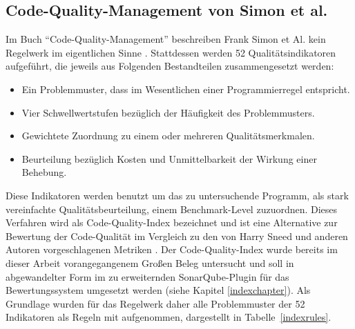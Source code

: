 \documentclass[da,ngerman]{stthesis}
\begin{document}
			\subsection{Code-Quality-Management von Simon et al.} \label{cqirules}
				Im Buch "`Code-Quality-Management"' beschreiben Frank Simon et Al. kein Regelwerk im eigentlichen Sinne \cite{CodeQualityManagement}. Stattdessen werden 52 Qualitätsindikatoren aufgeführt, die jeweils aus Folgenden Bestandteilen zusammengesetzt werden:
				\begin{itemize}
					\item Ein Problemmuster, dass im Wesentlichen einer Programmierregel entspricht.
					\item Vier Schwellwertstufen bezüglich der Häufigkeit des Problemmusters. 
					\item Gewichtete Zuordnung zu einem oder mehreren Qualitätsmerkmalen.
					\item Beurteilung bezüglich Kosten und Unmittelbarkeit der Wirkung einer Behebung. 
				\end{itemize} 
				Diese Indikatoren werden benutzt um das zu untersuchende Programm, als stark vereinfachte Qualitätsbeurteilung, einem Benchmark-Level zuzuordnen. Dieses Verfahren wird als Code-Quality-Index bezeichnet und ist eine Alternative zur Bewertung der Code-Qualität im Vergleich zu den von Harry Sneed und anderen Autoren vorgeschlagenen Metriken \cite{SoftwareInZahlen}. Der Code-Quality-Index wurde bereits im dieser Arbeit vorangegangenem Großen Beleg untersucht \cite{grosserBeleg} und soll in abgewandelter Form im zu erweiternden SonarQube-Plugin für das Bewertungssystem umgesetzt werden (siehe Kapitel \ref{indexchapter}). Als Grundlage wurden für das Regelwerk daher alle Problemmuster der 52 Indikatoren als Regeln mit aufgenommen, dargestellt in Tabelle~\ref{indexrules}.  
\end{document}

